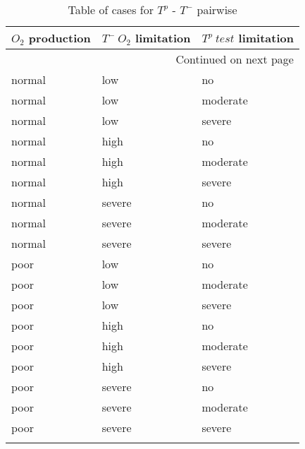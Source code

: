\begin{longtable}[c]{|l|l|l|}

  \hline \multicolumn{1}{|c|}{\textbf{$O_2$ production}} & \multicolumn{1}{c|}{\textbf{$T^-\ O_2$ limitation}} & \multicolumn{1}{c|}{\textbf{$T^p\ test$ limitation}}\\ \hline
  \endhead

  \hline \multicolumn{3}{|r|}{{Continued on next page}} \\ \hline
  \endfoot

  \endlastfoot

  normal & low & no \\ \hline
  normal & low & moderate \\ \hline
  normal & low & severe \\ \hline
  normal & high & no \\ \hline
  normal & high & moderate \\ \hline
  normal & high & severe \\ \hline
  normal & severe & no \\ \hline
  normal & severe & moderate \\ \hline
  normal & severe & severe \\ \hline
  poor & low & no \\ \hline
  poor & low & moderate \\ \hline
  poor & low & severe \\ \hline
  poor & high & no \\ \hline
  poor & high & moderate \\ \hline
  poor & high & severe \\ \hline
  poor & severe & no \\ \hline
  poor & severe & moderate \\ \hline
  poor & severe & severe \\ \hline

  \caption{Table of cases for $T^p$ - $T^-$ pairwise}
  \label{tab_Tpro-Tneg_cases}
\end{longtable}

